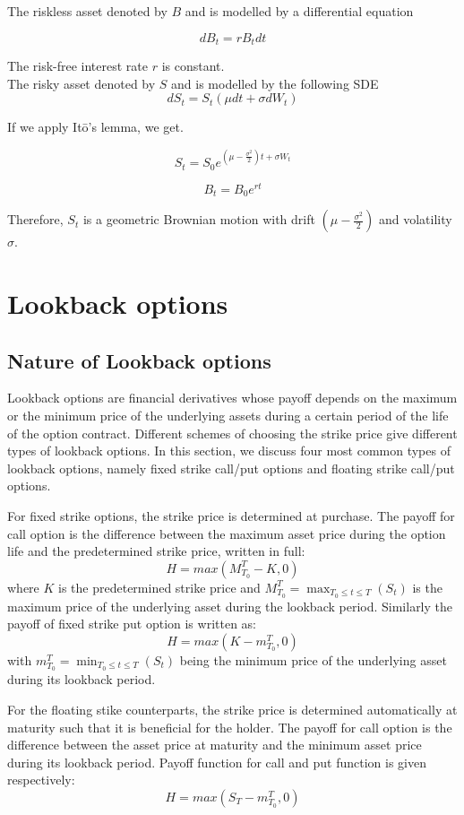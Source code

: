 \documentclass{article}
\begin{document}
The riskless asset denoted by $B$ and is modelled by a differential equation 

\[
dB_t=r B_t dt
\]

The risk-free interest rate $r$ is constant.\\

The risky asset denoted by $S$ and is modelled by the following SDE
\[
dS_t= S_t(\mu dt + \sigma dW_t) 
\]

If we apply It\={o}'s lemma, we get.

\[
S_t= S_0 e^{(\mu- \frac{\sigma^2}{2})t  + \sigma W_t} 
\]

\[
B_t= B_0  e^{rt}
\]

Therefore, $S_t$ is a geometric Brownian motion with drift $(\mu- \frac{\sigma^2}{2})$ and volatility $\sigma$.\\



\section{Lookback options 
}
\subsection{Nature of Lookback options
}

Lookback options are financial derivatives whose payoff depends on the maximum or the minimum price of the underlying assets during a certain period of the life of the option contract. Different schemes of choosing the strike price give different types of lookback options. In this section, we discuss four most common types of lookback options, namely fixed strike call/put options and floating strike call/put options.

For fixed strike options, the strike price is determined at purchase. The payoff for call option is the difference between the maximum asset price during the option life and the predetermined strike price, written in full:
\[
H=max(M_{T_0}^T - K, 0)
\]
where $K$ is the predetermined strike price and $M_{T_0}^T=\max_{T_0 \leq t \leq T}(S_t)$ is the maximum price of the underlying asset during the lookback period. Similarly the payoff of fixed strike put option is written as:
\[
H=max(K - m_{T_0}^T, 0)
\]
with $m_{T_0}^T=\min_{T_0 \leq t \leq T}(S_t)$ being the minimum price of the underlying asset during its lookback period.

For the floating stike counterparts, the strike price is determined automatically at maturity such that it is beneficial for the holder. The payoff for call option is the difference between the asset price at maturity and the minimum asset price during its lookback period. Payoff function for call and put function is given respectively:
\[
H=max(S_T - m_{T_0}^T, 0)
\]
\end{document}
